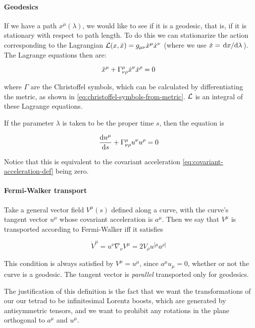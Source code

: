 \documentclass[main.tex]{subfiles}
\begin{document}
\paragraph{Geodesics}

If we have a path $x^\mu(\lambda)$, we would like to see if it is a geodesic, that is, if it is stationary with respect to path length. To do this we can stationarize the action corresponding to the Lagrangian $\mathcal{L} (x, \Dot{x}) = g_{\mu\nu} \Dot{x}^\mu \Dot{x}^\nu$ (where we use $\Dot{x} = \dv*{x}{\lambda}$). The Lagrange equations then are:

\begin{equation}
    \Ddot{x}^\mu + \Gamma^\mu_{\nu\rho} \Dot{x}^\nu \Dot{x}^\rho = 0
\end{equation}

where $\Gamma$ are the Christoffel symbols, which can be calculated by differentiating the metric, as shown in \eqref{eq:christoffel-symbols-from-metric}. $\mathcal{L}$ is an integral of these Lagrange equations.

If the parameter $\lambda$ is taken to be the proper time $s$, then the equation is

\begin{equation}
    \dv{u^\mu}{s} + \Gamma^\mu _{\nu\rho} u^\nu u^\rho = 0
\end{equation}

Notice that this is equivalent to the covariant acceleration \eqref{eq:covariant-acceleration-def} being zero.

\paragraph{Fermi-Walker transport}

Take a general vector field \(V ^{\mu} (s)\) defined along a curve, with the curve's tangent vector \(u^\mu\) whose covariant acceleration is \(a^\mu\).
Then we say that \(V^\mu\) is transported according to Fermi-Walker iff it satisfies

\begin{equation}
    \dot{V}^\mu  = u^\nu \nabla_\nu V^\mu
    = 2 V_\rho u^{[\mu} a^{\rho]}
\end{equation}

This condition is always satisfied by \(V^\mu = u^\mu\), since \(a^\mu u_\mu = 0\), whether or not the curve is a geodesic. The tangent vector is \emph{parallel} transported only for geodesics.

The justification of this definition is the fact that we want the transformations of our our tetrad to be infinitesimal Lorentz boosts, which are generated by antisymmetric tensors, and we want to prohibit any rotations in the plane orthogonal to \(a^\mu\) and \(u^\mu\).
\end{document}
